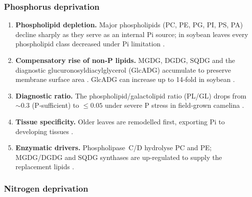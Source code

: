 \documentclass[10pt,letterpaper]{article}
\begin{document}
\subsubsection*{Phosphorus deprivation}
\label{sec:phosphorus}

\begin{enumerate}[label=\textbf{\arabic*.}, leftmargin=1.2em]
  \item \textbf{Phospholipid depletion.}  Major phospholipids (PC, PE, PG, PI, PS, PA) decline sharply as they serve as an internal Pi source; in soybean leaves every phospholipid class decreased under Pi limitation \citep[pp.~1,\,3,\,5]{lipid_remodeling_low_P_Saito}.

  \item \textbf{Compensatory rise of non‑P lipids.}  MGDG, DGDG, SQDG and the diagnostic glucuronosyldiacylglycerol (GlcADG) accumulate to preserve membrane surface area \citep[pp.~3--4]{Phosphate_deficiency_Wang}.  GlcADG can increase up to 14‑fold in soybean \citep{lipid_remodeling_low_P_Saito}.

  \item \textbf{Diagnostic ratio.}  The phospholipid/galactolipid ratio (PL/GL) drops from \(\sim\)0.3 (P‐sufficient) to \(\le 0.05\) under severe P stress in field‐grown camelina \citep[page~4]{Phosphate_deficiency_Wang}.

  \item \textbf{Tissue specificity.}  Older leaves are remodelled first, exporting Pi to developing tissues \citep[pp.~1,\,5]{lipid_remodeling_low_P_Saito}.

  \item \textbf{Enzymatic drivers.}  Phospholipase C/D hydrolyse PC and PE; MGDG/DGDG and SQDG synthases are up‑regulated to supply the replacement lipids \citep[pp.~1–2, 6]{Phosphate_scaracity_Xue}.
\end{enumerate}

\subsubsection*{Nitrogen deprivation}
\label{sec:nitrogen}
\end{document}
